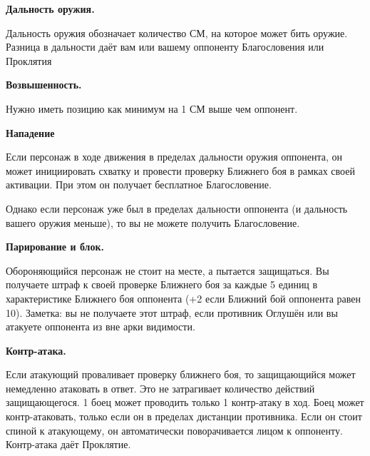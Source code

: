        \begin{multicols}{2}
            \textbf{Дальность оружия.}
    
            Дальность оружия обозначает количество СМ, на которое может бить оружие. 
            Разница в дальности даёт вам или вашему оппоненту Благословения или Проклятия

            \textbf{Возвышенность.}
    
            Нужно иметь позицию как минимум на 1 СМ выше чем оппонент.

            \textbf{Нападение}
    
            Если персонаж в ходе движения в пределах дальности оружия оппонента, он может инициировать 
            схватку и провести проверку Ближнего боя в рамках своей активации. При этом он получает бесплатное Благословение.

            Однако если персонаж уже был в пределах дальности оппонента (и дальность вашего оружия меньше),
            то вы не можете получить Благословение.

            \textbf{Парирование и блок.}
    
            Обороняющийся персонаж не стоит на месте, а пытается защищаться. Вы получаете штраф к своей проверке  
            Ближнего боя за каждые 5 единиц в характеристике Ближнего боя оппонента (+2 если Ближний бой оппонента равен 10).
            Заметка: вы не получаете этот штраф, если противник Оглушён или вы атакуете оппонента из вне арки видимости.

            \textbf{Контр-атака.}
    
            Если атакующий проваливает проверку ближнего боя, то защищающийся может немедленно атаковать в ответ. 
            Это не затрагивает количество действий защищающегося. 1 боец может проводить только 1 контр-атаку в ход.
            Боец может контр-атаковать, только если он в пределах дистанции противника.
            Если он стоит спиной к атакующему, он автоматически поворачивается лицом к оппоненту.
            Контр-атака даёт Проклятие.
    
        \end{multicols}
